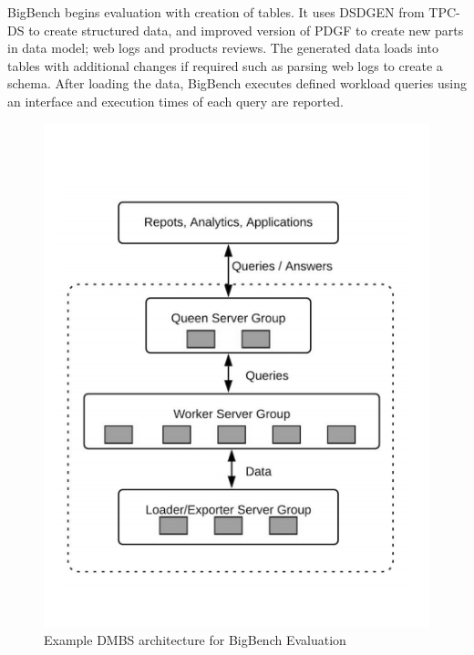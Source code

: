 \documentclass[sigconf,10pt]{acmart}
\begin{document}
BigBench begins evaluation with creation of tables. It uses DSDGEN from TPC-DS to create structured data, and improved version of PDGF to create new parts in data model; web logs and products reviews. The generated data loads into tables with additional changes if required such as parsing web logs to create a schema. After loading the data, BigBench executes defined workload queries using an interface and execution times of each query are reported.  
\begin{figure}[h!]
  \includegraphics[width=\linewidth]{bb_evaulation.png}
  \caption{Example DMBS architecture for BigBench Evaluation}
  \label{fig:boat1}
\end{figure}
\end{document}
